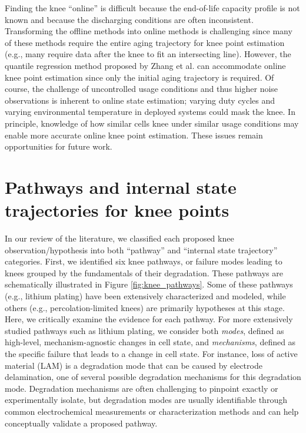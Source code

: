 \documentclass[journal=jpclcd,manuscript=article]{achemso}
\begin{document}
Finding the knee ``online'' is difficult because the end-of-life capacity profile is not known and because the discharging conditions are often inconsistent.
Transforming the offline methods into online methods is challenging since many of these methods require the entire aging trajectory for knee point estimation (e.g., many require data after the knee to fit an intersecting line). However, the quantile regression method proposed by Zhang et al.\cite{zhang_accelerated_2019} can accommodate online knee point estimation since only the initial aging trajectory is required.
Of course, the challenge of uncontrolled usage conditions and thus higher noise observations\cite{aitio_predicting_2021} is inherent to online state estimation; varying duty cycles and varying environmental temperature in deployed systems could mask the knee.
In principle, knowledge of how similar cells knee under similar usage conditions may enable more accurate online knee point estimation.
These issues remain opportunities for future work.

\section{Pathways and internal state trajectories for knee points}

In our review of the literature, we classified each proposed knee observation/hypothesis into both ``pathway'' and ``internal state trajectory'' categories.
First, we identified six knee pathways, or failure modes leading to knees grouped by the fundamentals of their degradation. These pathways are schematically illustrated in Figure \ref{fig:knee_pathways}. Some of these pathways (e.g., lithium plating) have been extensively characterized and modeled, while others (e.g., percolation-limited knees) are primarily hypotheses at this stage. Here, we critically examine the evidence for each pathway. For more extensively studied pathways such as lithium plating, we consider both \textit{modes}, defined as high-level, mechanism-agnostic changes in cell state, and \textit{mechanisms}, defined as the specific failure that leads to a change in cell state. For instance, loss of active material (LAM) is a degradation mode that can be caused by electrode delamination, one of several possible degradation mechanisms for this degradation mode. Degradation mechanisms are often challenging to pinpoint exactly or experimentally isolate, but degradation modes are usually identifiable through common electrochemical measurements or characterization methods and can help conceptually validate a proposed pathway.
\end{document}
